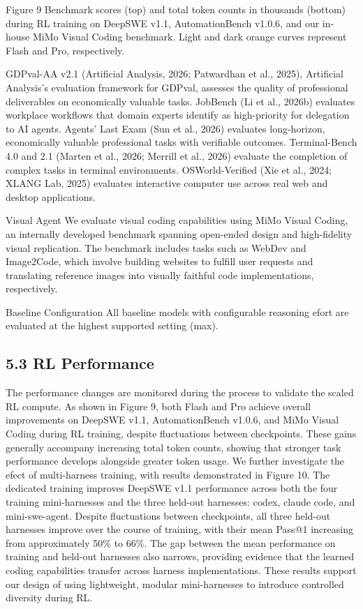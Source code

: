 \documentclass[
  10
]{article}
\begin{document}
Figure 9 Benchmark scores (top) and total token counts in thousands
(bottom) during RL training on DeepSWE v1.1, AutomationBench v1.0.6, and
our in-house MiMo Visual Coding benchmark. Light and dark orange curves
represent Flash and Pro, respectively.

GDPval-AA v2.1 (Artificial Analysis, 2026; Patwardhan et al., 2025),
Artificial Analysis's evaluation framework for GDPval, assesses the
quality of professional deliverables on economically valuable tasks.
JobBench (Li et al., 2026b) evaluates workplace workflows that domain
experts identify as high-priority for delegation to AI agents. Agents'
Last Exam (Sun et al., 2026) evaluates long-horizon, economically
valuable professional tasks with verifiable outcomes. Terminal-Bench 4.0
and 2.1 (Marten et al., 2026; Merrill et al., 2026) evaluate the
completion of complex tasks in terminal environments. OSWorld-Verified
(Xie et al., 2024; XLANG Lab, 2025) evaluates interactive computer use
across real web and desktop applications.

Visual Agent We evaluate visual coding capabilities using MiMo Visual
Coding, an internally developed benchmark spanning open-ended design and
high-fidelity visual replication. The benchmark includes tasks such as
WebDev and Image2Code, which involve building websites to fulfill user
requests and translating reference images into visually faithful code
implementations, respectively.

Baseline Configuration All baseline models with configurable reasoning
efort are evaluated at the highest supported setting (max).

\subsection{5.3 RL Performance}\label{rl-performance}

The performance changes are monitored during the process to validate the
scaled RL compute. As shown in Figure 9, both Flash and Pro achieve
overall improvements on DeepSWE v1.1, AutomationBench v1.0.6, and MiMo
Visual Coding during RL training, despite fluctuations between
checkpoints. These gains generally accompany increasing total token
counts, showing that stronger task performance develops alongside
greater token usage. We further investigate the efect of multi-harness
training, with results demonstrated in Figure 10. The dedicated training
improves DeepSWE v1.1 performance across both the four training
mini-harnesses and the three held-out harnesses: codex, claude code, and
mini-swe-agent. Despite fluctuations between checkpoints, all three
held-out harnesses improve over the course of training, with their mean
Pass@1 increasing from approximately 50\% to 66\%. The gap between the
mean performance on training and held-out harnesses also narrows,
providing evidence that the learned coding capabilities transfer across
harness implementations. These results support our design of using
lightweight, modular mini-harnesses to introduce controlled diversity
during RL.
\end{document}
